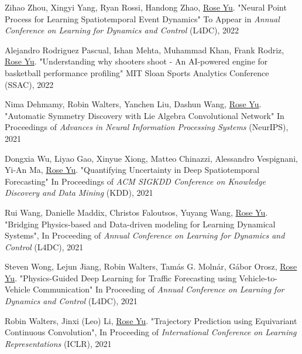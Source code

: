\documentclass[margin,line]{res}
\begin{document}
\begin{resume}
\begin{enumerate}[label={[C\arabic*]}]
\item 
 Zihao Zhou, Xingyi Yang, Ryan Rossi, Handong Zhao, \underline{Rose Yu}.
"Neural Point Process for Learning Spatiotemporal Event Dynamics"  To Appear in \textit{Annual Conference on Learning for Dynamics and Control}
 (L4DC), 2022
 
 \item Alejandro Rodriguez Pascual, Ishan Mehta, 
Muhammad Khan, Frank Rodriz, \underline{Rose Yu}. "Understanding why shooters shoot - An AI-powered engine for basketball performance profiling" MIT Sloan Sports Analytics Conference (SSAC), 2022 
 
\item 
Nima Dehmamy, Robin Walters, Yanchen Liu, Dashun Wang, \underline{Rose Yu}. "Automatic Symmetry Discovery with Lie Algebra Convolutional Network"
In Proceedings of \textit{Advances in Neural Information Processing Systems} (NeurIPS), 2021

\item Dongxia Wu, Liyao Gao, Xinyue Xiong, Matteo Chinazzi, Alessandro Vespignani, Yi-An Ma, \underline{Rose Yu}.
"Quantifying Uncertainty in Deep Spatiotemporal Forecasting"
In Proceedings of \textit{ACM SIGKDD Conference on Knowledge Discovery and Data Mining} (KDD), 2021

\item  Rui Wang, Danielle Maddix, Christos Faloutsos, Yuyang Wang, \underline{Rose Yu}. "Bridging Physics-based and Data-driven modeling for Learning Dynamical Systems", In Proceeding of 
\textit{Annual Conference on Learning for Dynamics and Control}
 (L4DC), 2021 


\item Steven Wong, Lejun Jiang, Robin Walters, Tam{\'{a}}s G. Moln{\'{a}}r, G{\'{a}}bor Orosz,  \underline{Rose Yu}. "Physics-Guided Deep Learning for Traffic Forecasting using Vehicle-to-Vehicle Communication" In Proceeding of  
\textit{Annual Conference on Learning for Dynamics and Control}
 (L4DC), 2021 


\item  Robin Walters, Jinxi (Leo) Li, \underline{Rose Yu}. "Trajectory Prediction using Equivariant Continuous Convolution", In Proceeding of \textit{International Conference on Learning Representations} (ICLR), 2021


\end{enumerate}
\end{resume}
\end{document}
